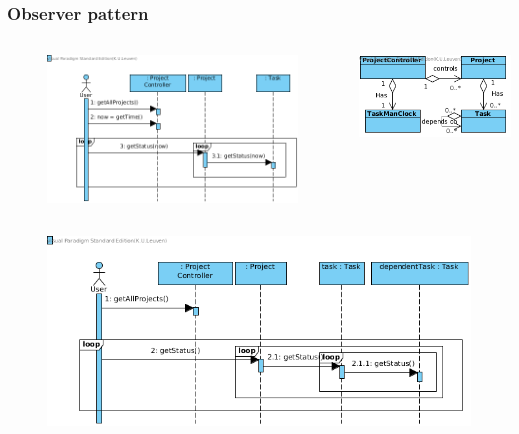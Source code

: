 \documentclass{beamer}
\begin{document}
\begin{frame}
\frametitle {Observer pattern}
\vspace{-0.5cm}
\begin{columns}
	\begin{column}{.58\paperwidth}
		\begin{figure}
			\includegraphics[width=0.55\paperwidth]{figures/OriginalDesignClock.png}
		\end{figure}
	\end{column}
	\begin{column}{.3\paperwidth}
		\includegraphics[width=0.3\paperwidth]{figures/MiniClassDiagram.png}
	\end{column}
\end{columns}
\vspace{-0.2cm}
\begin{figure}
	\includegraphics[width=0.68\paperwidth]{figures/FinalDesignClock.png}
\end{figure}
\end{frame}
\end{document}
